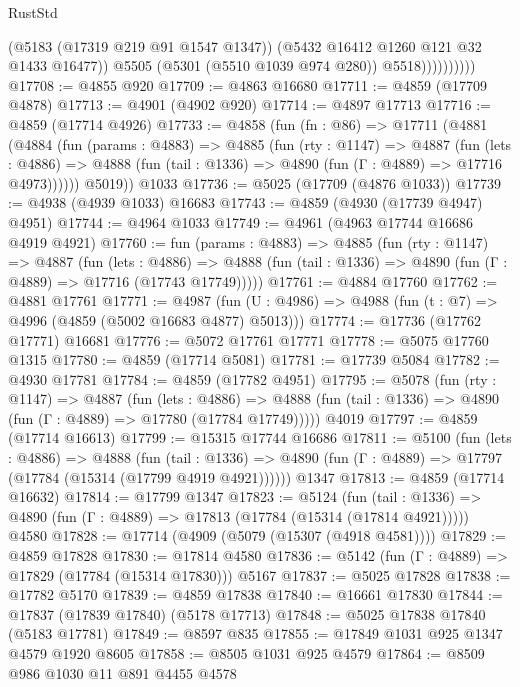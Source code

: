 \begin{lexlean}{RustStd}
\begin{coremodule}
                          (@5183 (@17319 @219 @91 @1547 @1347))
                          (@5432 @16412 @1260 @121 @32 @1433 @16477))
                        @5505
                        (@5301 (@5510 @1039 @974 @280))
                        @5518))))))))))
@17708 := @4855 @920
@17709 := @4863 @16680
@17711 := @4859 (@17709 @4878)
@17713 := @4901 (@4902 @920)
@17714 := @4897 @17713
@17716 := @4859 (@17714 @4926)
@17733 := @4858
    (fun (fn : @86) =>
    @17711
      (@4881
        (@4884
          (fun (params : @4883) =>
          @4885
            (fun (rty : @1147) =>
            @4887
              (fun (lets : @4886) =>
              @4888 (fun (tail : @1336) => @4890 (fun (Γ : @4889) => @17716 @4973))))))
        @5019))
    @1033
@17736 := @5025 (@17709 (@4876 @1033))
@17739 := @4938 (@4939 @1033) @16683
@17743 := @4859 (@4930 (@17739 @4947) @4951)
@17744 := @4964 @1033
@17749 := @4961 (@4963 @17744 @16686 @4919 @4921)
@17760 := fun (params : @4883) =>
  @4885
    (fun (rty : @1147) =>
    @4887
      (fun (lets : @4886) =>
      @4888 (fun (tail : @1336) => @4890 (fun (Γ : @4889) => @17716 (@17743 @17749)))))
@17761 := @4884 @17760
@17762 := @4881 @17761
@17771 := @4987
    (fun (U : @4986) => @4988 (fun (t : @7) => @4996 (@4859 (@5002 @16683 @4877) @5013)))
@17774 := @17736 (@17762 @17771) @16681
@17776 := @5072 @17761 @17771
@17778 := @5075 @17760 @1315
@17780 := @4859 (@17714 @5081)
@17781 := @17739 @5084
@17782 := @4930 @17781
@17784 := @4859 (@17782 @4951)
@17795 := @5078
    (fun (rty : @1147) =>
    @4887
      (fun (lets : @4886) =>
      @4888 (fun (tail : @1336) => @4890 (fun (Γ : @4889) => @17780 (@17784 @17749)))))
    @4019
@17797 := @4859 (@17714 @16613)
@17799 := @15315 @17744 @16686
@17811 := @5100
    (fun (lets : @4886) =>
    @4888
      (fun (tail : @1336) =>
      @4890 (fun (Γ : @4889) => @17797 (@17784 (@15314 (@17799 @4919 @4921))))))
    @1347
@17813 := @4859 (@17714 @16632)
@17814 := @17799 @1347
@17823 := @5124
    (fun (tail : @1336) => @4890 (fun (Γ : @4889) => @17813 (@17784 (@15314 (@17814 @4921)))))
    @4580
@17828 := @17714 (@4909 (@5079 (@15307 (@4918 @4581))))
@17829 := @4859 @17828
@17830 := @17814 @4580
@17836 := @5142 (fun (Γ : @4889) => @17829 (@17784 (@15314 @17830))) @5167
@17837 := @5025 @17828
@17838 := @17782 @5170
@17839 := @4859 @17838
@17840 := @16661 @17830
@17844 := @17837 (@17839 @17840) (@5178 @17713)
@17848 := @5025 @17838 @17840 (@5183 @17781)
@17849 := @8597 @835
@17855 := @17849 @1031 @925 @1347 @4579 @1920 @8605
@17858 := @8505 @1031 @925 @4579
@17864 := @8509 @986 @1030 @11 @891 @4455 @4578

\end{coremodule}
\end{lexlean}
